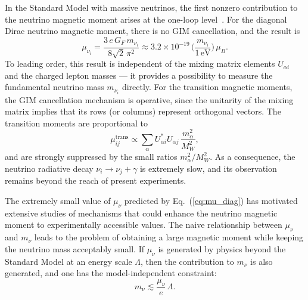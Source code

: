 \documentclass[a4paper,11pt]{article}
\begin{document}
In the Standard Model with massive neutrinos, the first nonzero contribution to the neutrino magnetic moment arises at the one-loop level~\cite{Fujikawa:Shrock:1980}. For the diagonal Dirac neutrino magnetic moment, there is no GIM cancellation, and the result is~\cite{Fujikawa:Shrock:1980}
\begin{equation}
\label{eq:mu_diag}
\mu_{\nu_i} = \frac{3\,e\,G_F\,m_{\nu_i}}{8\sqrt{2}\,\pi^2} \approx 3.2 \times 10^{-19}\,\Big(\frac{m_{\nu_i}}{1\,\text{eV}}\Big)\,\mu_B.
\end{equation}
To leading order, this result is independent of the mixing matrix elements $U_{\alpha i}$ and the charged lepton masses --- it provides a possibility to measure the fundamental neutrino mass $m_{\nu_i}$ directly. For the transition magnetic moments, the GIM cancellation mechanism is operative, since the unitarity of the mixing matrix implies that its rows (or columns) represent orthogonal vectors. The transition moments are proportional to
\begin{equation}
\mu_{ij}^{\text{trans}} \propto \sum_\alpha U_{\alpha i}^* U_{\alpha j}\,\frac{m_\alpha^2}{M_W^2},
\end{equation}
and are strongly suppressed by the small ratios $m_\alpha^2/M_W^2$. As a consequence, the neutrino radiative decay $\nu_i \to \nu_j + \gamma$ is extremely slow, and its observation remains beyond the reach of present experiments.

The extremely small value of $\mu_\nu$ predicted by Eq.~(\ref{eq:mu_diag}) has motivated extensive studies of mechanisms that could enhance the neutrino magnetic moment to experimentally accessible values. The naive relationship between $\mu_\nu$ and $m_\nu$ leads to the problem of obtaining a large magnetic moment while keeping the neutrino mass acceptably small. If $\mu_\nu$ is generated by physics beyond the Standard Model at an energy scale $\Lambda$, then the contribution to $m_\nu$ is also generated, and one has the model-independent constraint:
\begin{equation}
m_\nu \lesssim \frac{\mu_\nu}{e}\,\Lambda.
\end{equation}
\end{document}
